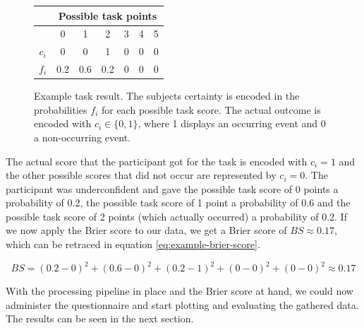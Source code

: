 \documentclass[../main/main.tex]{subfiles}
\begin{document}
	\begin{figure}[h]
		\centering
		\begin{tabular}{c|c|c|c|c|c|c|}
			& \multicolumn{6}{c|}{Possible task points} \\
			\hline
			& 0 & 1 & 2 & 3 & 4 & 5 \\
			\hline
			$c_i$ & 0 & 0 & 1 & 0 & 0 & 0 \\
			$f_i$ & 0.2 & 0.6 & 0.2 & 0 & 0 & 0\\
		\end{tabular}
		\caption{Example task result. The subjects certainty is encoded in the probabilities $f_i$ for each possible task score. The actual outcome is encoded with $c_i \in \{0, 1\}$, where 1 displays an occurring event and 0 a non-occurring event.}
		\label{fig:example}
	\end{figure}

	The actual score that the participant got for the task is encoded with $c_i = 1$ and the other possible scores that did not occur are represented by $c_i = 0$. The participant was underconfident and gave the possible task score of 0 points a probability of 0.2, the possible task score of 1 point a probability of 0.6 and the possible task score of 2 points (which actually occurred) a probability of 0.2. If we now apply the Brier score to our data, we get a Brier score of $BS \approx 0.17$, which can be retraced in equation \ref{eq:example-brier-score}.
	
	\begin{equation}
		\label{eq:example-brier-score}
		BS = (0.2 - 0)^2 + (0.6 - 0)^2 + (0.2 - 1)^2 + (0 - 0)^2 + (0 - 0)^2 \approx 0.17
	\end{equation}
	
	\noindent With the processing pipeline in place and the Brier score at hand, we could now administer the questionnaire and start plotting and evaluating the gathered data. The results can be seen in the next section.
\end{document}
